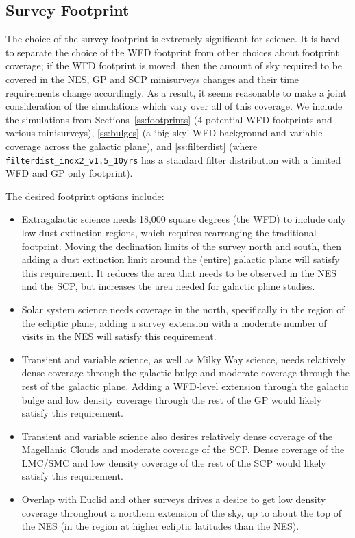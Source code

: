 \subsection{Survey Footprint}\label{sec:bigfootprints}

The choice of the survey footprint is extremely significant for science. It is hard to separate the choice of the WFD footprint from other choices about footprint coverage; if the WFD footprint is moved, then the amount of sky required to be covered in the NES, GP and SCP minisurveys changes and their time requirements change accordingly. As a result, it seems reasonable to make a joint consideration of the simulations which vary over all of this coverage. We include the simulations from Sections~\ref{ss:footprints} (4 potential WFD footprints and various minisurveys),  \ref{ss:bulges} (a `big sky' WFD background and variable coverage across the galactic plane), and \ref{ss:filterdist} (where {\tt filterdist\_indx2\_v1.5\_10yrs} has a standard filter distribution with a limited WFD and GP only footprint). 

The desired footprint options include:
\begin{itemize}
\item Extragalactic science needs 18,000 square degrees (the WFD) to include only low dust extinction regions, which requires rearranging the traditional footprint. Moving the declination limits of the survey north and south, then adding a dust extinction limit around the (entire) galactic plane will satisfy this requirement. It reduces the area that needs to be observed in the NES and the SCP, but increases the area needed for galactic plane studies. 
\item Solar system science needs coverage in the north, specifically in the region of the ecliptic plane; adding a survey extension with a moderate number of visits in the NES will satisfy this requirement. 
\item Transient and variable science, as well as Milky Way science, needs relatively dense coverage through the galactic bulge and moderate coverage through the rest of the galactic plane. Adding a WFD-level extension through the galactic bulge and low density coverage through the rest of the GP would likely satisfy this requirement.
\item Transient and variable science also desires relatively dense coverage of the Magellanic Clouds and moderate coverage of the SCP. Dense coverage of the LMC/SMC and low density coverage of the rest of the SCP would likely satisfy this requirement.
\item Overlap with Euclid and other surveys drives a desire to get low density coverage throughout a northern extension of the sky, up to about the top of the NES (in the region at higher ecliptic latitudes than the NES).
\end{itemize}

